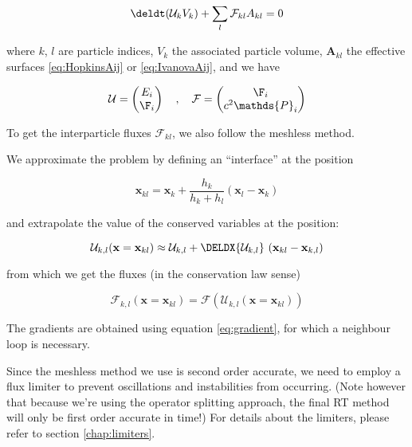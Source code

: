 \begin{align}
	\deldt(\mathcal{U}_k V_k) + \sum\limits_{l} \mathcal F_{kl} A_{kl} = 0 \label{eq:meshless}
\end{align}

where $k$, $l$ are particle indices, $V_k$ the associated particle volume,
$\mathbf{A}_{kl}$ the effective surfaces \ref{eq:HopkinsAij} or \ref{eq:IvanovaAij}, and we have

\begin{align}
	\mathcal{U} =
		\begin{pmatrix}
			E_i \\
			\F_i
		\end{pmatrix}
	\quad , \quad
	\mathcal{F} =
		\begin{pmatrix}
			\F_i \\
			c^2 \mathds{P}_i
		\end{pmatrix}
\end{align}



To get the interparticle fluxes $\mathcal{F}_{kl}$, we also follow the meshless method.

We approximate the problem by defining an ``interface'' at the position

\begin{equation}
	\mathbf{x}_{kl} = \mathbf{x}_k + \frac{h_k}{h_k + h_l} ( \mathbf{x}_l - \mathbf{x}_k )
\end{equation}

and extrapolate the value of the conserved variables at the position:

\begin{equation}
	\mathcal{U}_{k, l}(\mathbf{x} =
        \mathbf{x}_{kl}) \approx \mathcal{U}_{k, l} + \DELDX{ \mathcal{U}_{k, l}}\ (\mathbf{x}_{kl} - \mathbf{x}_{k,l})
\end{equation}

from which we get the fluxes (in the conservation law sense)

\begin{equation}
	\mathcal{F}_{k, l}(\mathbf{x} =
        \mathbf{x}_{kl}) = \mathcal{F}\left( \mathcal{U}_{k, l}(\mathbf{x} = \mathbf{x}_{kl}) \right)
\end{equation}


The gradients are obtained using equation \ref{eq:gradient}, for which a neighbour
loop is necessary.


Since the meshless method we use is second order accurate, we need to employ a
flux limiter to prevent oscillations and instabilities from occurring.
(Note however that because we're using the operator splitting approach, the
final RT method will only be first order accurate in time!) For details about
the limiters, please refer to section \ref{chap:limiters}.




